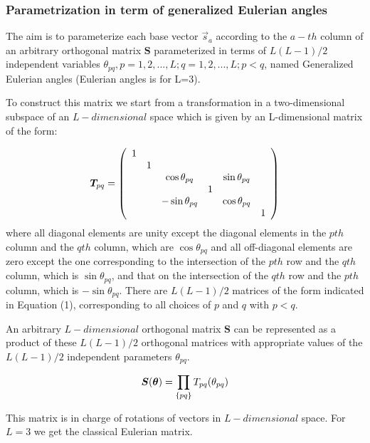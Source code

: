 \documentclass[preprint,amsmath,amssymb,superscriptaddress,showpacs,pre]{revtex4-1}
\let\originalleft\left
\let\originalright\right
\renewcommand{\left}{\mathopen{}\mathclose\bgroup\originalleft}
\renewcommand{\right}{\aftergroup\egroup\originalright}
\begin{document}
\subsubsection{Parametrization in term of generalized Eulerian angles}
The aim is to  parameterize each base vector $\vec{s}_a$ according to the $a-th$ column of an arbitrary orthogonal matrix $\bm S$ parameterized   in terms of $L(L-1)/2$ independent variables  $\theta_ {pq}, p =1,2, ..., L; q =1,2, ..., L; p <q $, named Generalized Eulerian angles (Eulerian angles is for L=3).

To construct this matrix we start from a  transformation in a two-dimensional subspace of an $L-dimensional$ space which is given by an L-dimensional matrix of the  form:

\begin{equation} 
\bm T_{pq} =  \left(
\begin{array}{cccccc}
1 &   &  &  &  &\\
 & 1& & & & \\
& & \cos\theta_{pq} & & \sin\theta_{pq}\\
& &  & 1 & &\\
& &  -\sin\theta_{pq}& & \cos\theta_{pq} &\\
& &  & &  & 1\\
\end{array}
\right)
\end{equation}
where all diagonal elements are unity except the diagonal elements in the $pth$ column and the $qth$ column, which are $\cos\theta_{pq}$ and all off-diagonal elements are zero except the one corresponding to the intersection of the $pth$ row and the $qth$ column, which is $\sin\theta_{pq}$, and that on the intersection of the $qth$ row and the $pth$ column, which is $-\sin\theta_{pq}$. There are $L(L - 1)/2$  matrices of the form indicated in Equation (1), corresponding to all choices of $p$ and $q$ with $p <q$.

An arbitrary  $L-dimensional$ orthogonal matrix $\bm S$ can be represented as a product of these $L(L-1)/2$ orthogonal matrices with appropriate values of the $L(L-1)/2$ independent parameters $\theta_{pq}$.

\begin{equation}
\bm S (\bm \theta)=\prod_{\left\lbrace pq\right\rbrace }T_{pq}(\theta_{pq})
\end{equation}
 
 This matrix is in charge of rotations of vectors in $L-dimensional$ space. For $L=3$ we get the classical Eulerian matrix. 
\end{document}
